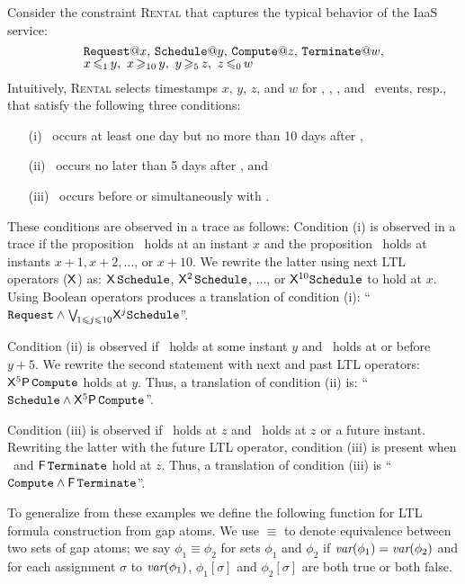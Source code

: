 \begin{examp}\label{ex:manual-translation}
Consider the constraint \textsc{Rental} that 
captures the typical behavior 
of the IaaS service:
\[
\def\arraystretch{.8}      
\begin{array}{l}
\Request@x,\,
\Schedule@y,\,
\Compute@z,\,
\Terminate@w,\\
x \tight{\leq_1} y,~
x \tight{\geq_{10}} y,~
y \tight{\geq_5} z,~
z \tight{\leq_0} w
\end{array}
\]
Intuitively, \textsc{Rental}
selects timestamps $x$, $y$, $z$, and $w$ for
\Request, \Schedule, \Compute, and \Terminate\ events, resp.,
that satisfy the following three conditions:
\begin{itemize}
\item[(i)]
  \Schedule\ occurs at least one day 
  but no more than 10 days after \Request,
\item[(ii)]
  \Compute\ occurs no later than 5 days after \Schedule,
  and
\item[(iii)]
  \Compute\ occurs before or simultaneously with \Terminate.
\end{itemize}

These conditions are observed in a trace as follows:
Condition (i) is observed in a trace
if the proposition \Request\ holds at an instant $x$
and the proposition \Schedule\ holds at
instants $x{+}1, x{+}2, \dots$, or $x{+}10$.
We rewrite the latter
using next LTL operators (${\sf X}$) as:
${\sf X}\,\texttt{Schedule}$,
${\sf X}^{2\,}\texttt{Schedule}$,
$\dots$, or
${\sf X}^{10}\texttt{Schedule}$ to hold at $x$.
Using Boolean operators produces a translation of condition (i):
``$\texttt{Request}\land\bigvee_{\!1\leqslant j\leqslant 10}\!{\sf X}^j\texttt{Schedule}$''.

Condition (ii) is observed
if \Schedule\ holds at some instant $y$
and \Compute\ holds at or before $y{+}5$.
We rewrite the second statement with next and past LTL operators:
${\sf X}^{5}{\sf P}\,\mbox{{\tt Compute}}$ holds at $y$.
Thus, a translation of condition (ii) is:
``$\texttt{Schedule}\land{\sf X}^5{\sf P}\,\mbox{{\tt Compute}}$''.

Condition (iii) is observed
if \Compute\ holds at $z$
and \Terminate\ holds at $z$ or a future instant.
Rewriting the latter with the future LTL operator,
condition (iii) is present when
\Compute\ and ${\sf F}\,\texttt{Terminate}$ hold at $z$.
Thus, a translation of condition (iii) is
``$\mbox{{\tt Compute}}\land{\sf F}\,\texttt{Terminate}$''.
\end{examp}

To generalize from these examples
we define the following function
for LTL formula construction from gap atoms.
We use $\equiv$ to denote equivalence between two sets of gap atoms;
we say $\phi_1 \equiv \phi_2$ for sets $\phi_1$ and $\phi_2$
if $\textit{var}(\phi_1)=\textit{var}(\phi_2)$
and for each assignment $\sigma$ to $\textit{var}(\phi_1)$,
$\phi_1[\sigma]$ and $\phi_2[\sigma]$ are both true or both false.

